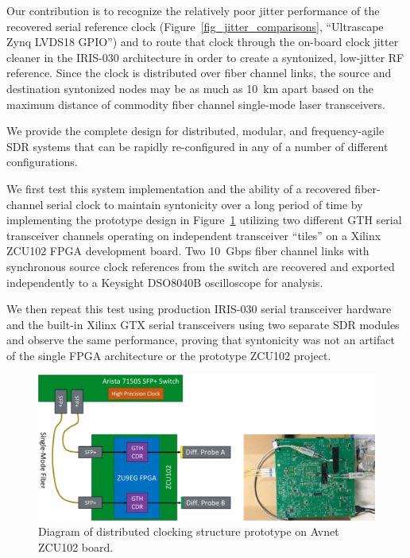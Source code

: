 Our contribution is to recognize the relatively poor jitter performance of the recovered serial reference clock (Figure~\ref{fig_jitter_comparisons}, ``Ultrascape Zynq LVDS18 GPIO'') and to route that clock through the on-board clock jitter cleaner in the IRIS-030 architecture in order to create a syntonized, low-jitter RF reference.
Since the clock is distributed over fiber channel links, the source and destination syntonized nodes may be as much as 10~km apart based on the maximum distance of commodity fiber channel single-mode laser transceivers.

We provide the complete design for distributed, modular, and frequency-agile \ac{SDR} systems that can be rapidly re-configured in any of a number of different configurations.

We first test this system implementation and the ability of a recovered fiber-channel serial clock to maintain syntonicity over a long period of time by implementing the prototype design in Figure~\ref{fig_zcu_diagram_pic} utilizing two different GTH serial transceiver channels operating on independent transceiver ``tiles'' on a Xilinx ZCU102 \ac{FPGA} development board.
Two 10~Gbps fiber channel links with synchronous source clock references from the switch are recovered and exported independently to a Keysight DSO8040B oscilloscope for analysis.

We then repeat this test using production IRIS-030 serial transceiver hardware and the built-in Xilinx GTX serial transceivers using two separate \ac{SDR} modules and observe the same performance, proving that syntonicity was not an artifact of the single \ac{FPGA} architecture or the prototype ZCU102 project.

\begin{figure}[p]
\centering
\includegraphics[width=1\textwidth]{figs/clk/zcu102_clocking_diagram}
\caption{Diagram of distributed clocking structure prototype on Avnet ZCU102 board.}
\label{fig_zcu_diagram_pic}
\end{figure}


